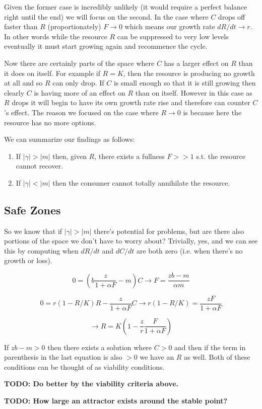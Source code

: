 \documentclass[11pt,a5paper]{book}
\begin{document}
Given the former case is incredibly unlikely (it would require a perfect balance right until the end) we will focus on the second. In the case where $C$ drops off faster than $R$ (proportionately) $F\rightarrow 0$ which means our growth rate $dR/dt\rightarrow r$. In other words while the resource $R$ can be suppressed to very low levels eventually it must start growing again and recommence the cycle.
\newline

Now there are certainly parts of the space where $C$ has a larger effect on $R$ than it does on itself. For example if $R=K$, then the resource is producing no growth at all and so $R$ can only drop. If $C$ is small enough so that it is still growing then clearly $C$ is having more of an effect on $R$ than on itself. However in this case as $R$ drops it will begin to have its own growth rate rise and therefore can counter $C$'s effect. The reason we focused on the case where $R\rightarrow 0$ is because here the resource has no more options. \newline

We can summarize our findings as follows:

\begin{enumerate}
\item If $|\gamma| > |m|$ then, given $R$, there exists a fullness $F>>1$ s.t. the resource cannot recover.
\item If $|\gamma| < |m|$ then the consumer cannot totally annihilate the resource. 
\end{enumerate}

\subsection{Safe Zones}

So we know that if $|\gamma| > |m|$ there's potential for problems, but are there also portions of the space we don't have to worry about? Trivially, yes, and we can see this by computing when $dR/dt$ and $dC/dt$ are both zero (i.e. when there's no growth or loss). 

$$0 = \left( b\frac{z}{1+\alpha F}-m \right)C \rightarrow F= \frac{zb-m}{\alpha m}$$

$$0 = r(1-R/K)R-\frac{z}{1+\alpha F}C \rightarrow r(1-R/K)=\frac{zF}{1+\alpha F}$$

$$\rightarrow R = K\left( 1 - \frac{z}{r}\frac{F}{1+\alpha F} \right)$$

If $zb-m>0$ then there exists a solution where $C>0$ and then if the term in parenthesis in the last equation is also $>0$ we have an $R$ as well. Both of these conditions can be thought of as viability conditions. 

\textbf{TODO: Do better by the viability criteria above.}

\textbf{TODO: How large an attractor exists around the stable point?}
\end{document}
